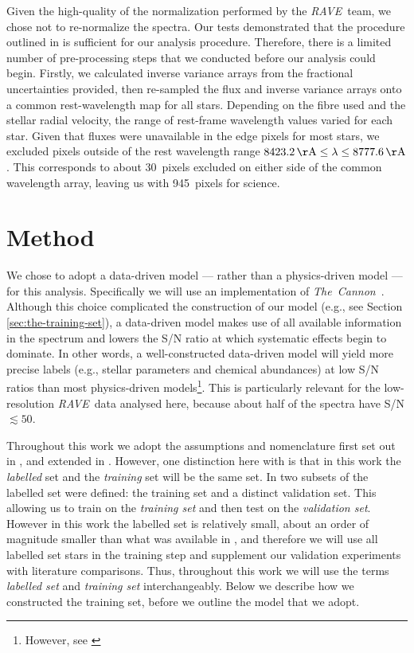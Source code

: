 \documentclass[preprint,trackchanges]{aastex}
\newcommand{\acronym}[1]{{\small{#1}}}
\newcommand{\project}[1]{\textsl{#1}}
\newcommand{\thecannon}{\project{The~Cannon}}
\newcommand{\rave}{\project{\acronym{RAVE}}}
\begin{document}
Given the high-quality of the normalization performed by the \rave\ team, we chose
not to re-normalize the spectra.  Our tests demonstrated that the procedure 
outlined in \citet{Kunder_2016} is sufficient for our analysis procedure. Therefore,
there is a limited number of pre-processing steps that we conducted before our
analysis could begin.  Firstly, we calculated inverse variance arrays from the
fractional uncertainties provided, then re-sampled the flux and inverse variance
arrays onto a common rest-wavelength map for all stars.  Depending on the fibre 
used and the stellar radial velocity, the range of rest-frame wavelength values
varied for each star.  Given that fluxes were unavailable in the edge pixels for 
most stars, we excluded pixels outside of the rest wavelength range 
$8423.2\,{\rm \AA} \le \lambda \le 8777.6\,{\rm \AA}$.  This corresponds to about
30~pixels excluded on either side of the common wavelength array, leaving us with
945~pixels for science.


\section{Method}
\label{sec:method}

We chose to adopt a data-driven model --- rather than a physics-driven model ---
for this analysis.  Specifically we will use an implementation of \thecannon\
\citep{Ness_2015,Ness_2016}.  Although this choice complicated the construction 
of our model (e.g., see Section \ref{sec:the-training-set}), a data-driven model 
makes use of all available information in the spectrum and lowers the S/N ratio 
at which systematic effects begin to dominate.  In other words, a well-constructed
data-driven model will yield more precise labels (e.g., stellar parameters and
chemical abundances) at low S/N ratios than most physics-driven models\footnote{
However, see \citet{Casey_2016a}}.  This is particularly relevant for the 
low-resolution \rave\ data analysed here, because about half of the spectra have
S/N $\lesssim 50$. 


Throughout this work we adopt the assumptions and nomenclature first set out in
\citet{Ness_2015}, and extended in \citet{Casey_2016b}.  However, one distinction 
here with \citet{Casey_2016b} is that in this work the \emph{labelled} set and the
\emph{training} set will be the same set.  In \citet{Casey_2016b} two subsets of
the labelled set were defined: the training set and a distinct validation set.
This allowing us to train on the \emph{training set} and then test on the 
\emph{validation set}.  However in this work the labelled set is relatively 
small, about an order of magnitude smaller than what was available in 
\citet{Casey_2016b}, and therefore we will use all labelled set stars in the 
training step and supplement our validation experiments with literature comparisons.
Thus, throughout this work we will use the terms \emph{labelled set} and 
\emph{training set} interchangeably.  Below we describe how we constructed the 
training set, before we outline the model that we adopt.
\end{document}
